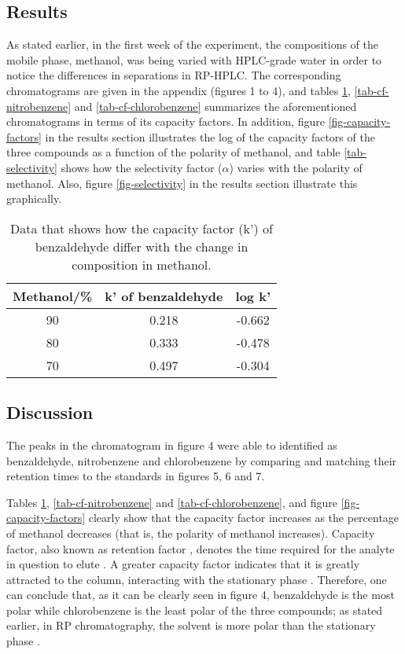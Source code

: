 \documentclass[a4paper, 12pt]{article}
\begin{document}
\subsection{Results}
As stated earlier, in the first week of the experiment, the compositions of the mobile phase, methanol, was being varied with HPLC-grade water in order to notice the differences in separations in RP-HPLC. The corresponding chromatograms are given in the appendix (figures 1 to 4), and tables \ref{tab-cf-benzaldehyde}, \ref{tab-cf-nitrobenzene} and \ref{tab-cf-chlorobenzene} summarizes the aforementioned chromatograms in terms of its capacity factors. In addition, figure \ref{fig-capacity-factors} in the results section illustrates the log of the capacity factors of the three compounds as a function of the polarity of methanol, and table \ref{tab-selectivity} shows how the selectivity factor ($\alpha$) varies with the polarity of methanol. Also, figure \ref{fig-selectivity} in the results section illustrate this graphically.

\begin{table}[h!]
	\centering
	\caption{Data that shows how the capacity factor (k') of benzaldehyde differ with the change in composition in methanol.}
	\begin{tabular}{|c|c|c|}
		\hline
		Methanol/\% & k' of benzaldehyde & log k' \\
		\hline
		90 & 0.218 & -0.662 \\
		\hline
		80 & 0.333 & -0.478 \\
		\hline
		70 & 0.497 & -0.304 \\
		\hline
	\end{tabular}
	\label{tab-cf-benzaldehyde}
\end{table}


\subsection{Discussion}
The peaks in the chromatogram in figure 4 were able to identified as benzaldehyde, nitrobenzene and chlorobenzene by comparing and matching their retention times to the standards in figures 5, 6 and 7. 

Tables \ref{tab-cf-benzaldehyde}, \ref{tab-cf-nitrobenzene} and \ref{tab-cf-chlorobenzene}, and figure \ref{fig-capacity-factors} clearly show that the capacity factor increases as the percentage of methanol decreases (that is, the polarity of methanol increases). Capacity factor, also known as retention factor \cite{harris}, denotes the time required for the analyte in question to elute \cite{harris}. A greater capacity factor indicates that it is greatly attracted to the column, interacting with the stationary phase \cite{harris}. Therefore, one can conclude that, as it can be clearly seen in figure 4, benzaldehyde is the most polar while chlorobenzene is the least polar of the three compounds; as stated earlier, in RP chromatography, the solvent is more polar than the stationary phase \cite{harris}.
\end{document}
